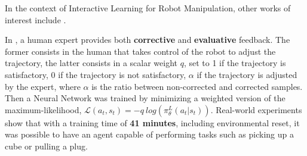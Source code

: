 In the context of Interactive Learning for Robot Manipulation, other works of interest include \cite{mandlekar2020human_in_the_loop,chisari2022correct}. 

In \cite{chisari2022correct}, a human expert provides both \textbf{corrective} and \textbf{evaluative} feedback. The former consists in the human that takes control of the robot to adjust the trajectory, the latter consists in a scalar weight $q$, set to 1 if the trajectory is satisfactory, 0 if the trajectory is not satisfactory, $\alpha$ if the trajectory is adjusted by the expert, where $\alpha$ is the ratio between non-corrected and corrected samples. Then a Neural Network was trained by minimizing a weighted version of the maximum-likelihood, $\mathcal{L}(a_{t},s_{t}) = - q \ log(\pi^{L}_{\theta}(a_{t}|s_{t}))$. Real-world experiments show that with a training time of \textbf{41 minutes}, including environmental reset, it was possible to have an agent capable of performing tasks such as picking up a cube or pulling a plug.